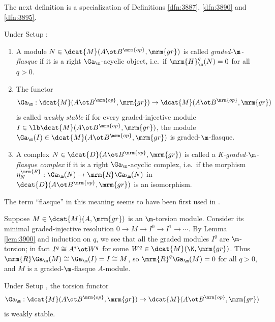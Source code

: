 The next definition is a specialization of Definitions \ref{dfn:3887}, 
\ref{dfn:3890} and \ref{dfn:3895}.

\begin{dfn} \label{dfn:3748} 
Under Setup \tup{\ref{setup:3755}}:
\begin{enumerate}
\item A module $N \in \dcat{M}(A \ot B^{\mrm{op}}, \mrm{gr})$
is called {\em graded-$\m$-flasque}%
if it is a right $\Ga_{\m}$-acyclic object, i.e.\ if 
$\mrm{H}^q_{\m}(N) = 0$ for all $q > 0$.

\item The functor 
\[ \Ga_{\m} : \dcat{M}(A \ot B^{\mrm{op}}, \mrm{gr}) \to
\dcat{M}(A \ot B^{\mrm{op}}, \mrm{gr}) \]
is called {\em weakly stable}%
if for every graded-injective module
$I \in \lb \dcat{M}(A \ot B^{\mrm{op}}, \mrm{gr})$, 
the module  
$\Ga_{\m}(I) \in \dcat{M}(A \ot B^{\mrm{op}}, \mrm{gr})$
is graded-$\m$-flasque. 

\item A complex  $N \in \dcat{D}(A \ot B^{\mrm{op}}, \mrm{gr})$
is called a {\em K-graded-$\m$-flasque complex}%
if it is a right $\Ga_{\m}$-acyclic complex, i.e.\ if the morphism 
$\eta^{\mrm{R}}_{N} : \Ga_{\m}(N) \to \mrm{R} \Ga_{\m}(N)$
in $\dcat{D}(A \ot B^{\mrm{op}}, \mrm{gr})$ is an isomorphism. 
\end{enumerate}
\end{dfn}

The term ``flasque'' in this meaning seems to have been first used in 
\cite{YeZh5}.

\begin{exa} \label{exa:3745}
Suppose $M \in \dcat{M}(A, \mrm{gr})$ is an $\m$-torsion module. Consider its 
minimal graded-injective resolution 
$0 \to M \to I^0 \to I^1 \to  \cdots$. 
By Lemma \ref{lem:3900} and induction on $q$, we see that all the graded 
modules $I^q$ are $\m$-torsion; in fact 
$I^q \cong A^* \ot W^q$ for some $W^q \in \dcat{M}(\K, \mrm{gr})$. 
Thus
$\mrm{R} \Ga_{\m}(M) \cong \Ga_{\m}(I) = I \cong M$,
so $\mrm{R}^q \Ga_{\m}(M) = 0$ for all $q > 0$, and $M$ is a 
graded-$\m$-flasque $A$-module. 
\end{exa}

\begin{thm} \label{thm:3900}
Under Setup \tup{\ref{setup:3755}}, the torsion functor
\[ \Ga_{\m} : \dcat{M}(A \ot B^{\mrm{op}}, \mrm{gr}) \to 
\dcat{M}(A \ot B^{\mrm{op}}, \mrm{gr}) \]
is weakly stable.
\end{thm}

